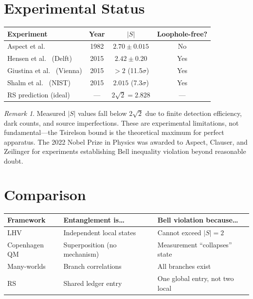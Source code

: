 \documentclass[12pt,a4paper]{article}
\theoremstyle{definition}
\theoremstyle{remark}
\newtheorem{remark}[theorem]{Remark}
\begin{document}
\section{Experimental Status}
\label{sec:experiment}

\begin{center}
\renewcommand{\arraystretch}{1.3}
\begin{tabular}{@{}lccc@{}}
\toprule
\textbf{Experiment} & \textbf{Year} &
\textbf{$|S|$} & \textbf{Loophole-free?} \\
\midrule
Aspect et al.~\cite{Aspect1982} & 1982 &
$2.70 \pm 0.015$ & No \\
Hensen et al.~\cite{Hensen2015} (Delft) & 2015 &
$2.42 \pm 0.20$ & Yes \\
Giustina et al.~\cite{Giustina2015} (Vienna) & 2015 &
$> 2$ (11.5$\sigma$) & Yes \\
Shalm et al.~\cite{Shalm2015} (NIST) & 2015 &
$2.015$ (7.3$\sigma$) & Yes \\
\midrule
RS prediction (ideal) & --- & $2\sqrt{2} = 2.828$ & --- \\
\bottomrule
\end{tabular}
\end{center}

\begin{remark}
Measured $|S|$ values fall below $2\sqrt{2}$ due to finite
detection efficiency, dark counts, and source imperfections.
These are experimental limitations, not fundamental---the
Tsirelson bound is the theoretical maximum for perfect
apparatus.  The 2022 Nobel Prize in Physics was awarded to
Aspect, Clauser, and Zeilinger for experiments establishing
Bell inequality violation beyond reasonable doubt.
\end{remark}

\section{Comparison}
\label{sec:comparison}

\begin{center}
\renewcommand{\arraystretch}{1.3}
\begin{tabular}{@{}lll@{}}
\toprule
\textbf{Framework} & \textbf{Entanglement is\ldots} &
\textbf{Bell violation because\ldots} \\
\midrule
LHV & Independent local states &
Cannot exceed $|S| = 2$ \\
Copenhagen QM & Superposition (no mechanism) &
Measurement ``collapses'' state \\
Many-worlds & Branch correlations &
All branches exist \\
RS & Shared ledger entry &
One global entry, not two local \\
\bottomrule
\end{tabular}
\end{center}
\end{document}
